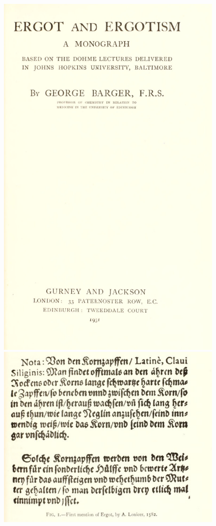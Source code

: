 \begin{figure}[H]
	\centering

	\includegraphics[height=.3\textheight]{media/1-ergotcover.png}
	\includegraphics[height=.3\textheight]{media/1-ergotparagraph.png}

\end{figure}

